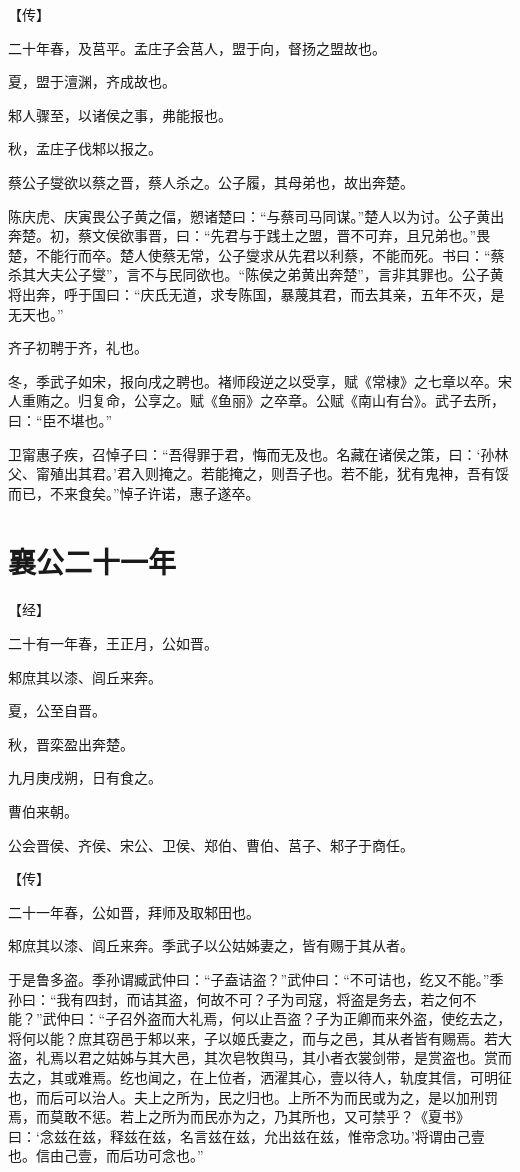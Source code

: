 \documentclass[a4paper,12pt,UTF8,twoside]{ctexbook}
\begin{document}
【传】

二十年春，及莒平。孟庄子会莒人，盟于向，督扬之盟故也。

夏，盟于澶渊，齐成故也。

邾人骤至，以诸侯之事，弗能报也。

秋，孟庄子伐邾以报之。

蔡公子燮欲以蔡之晋，蔡人杀之。公子履，其母弟也，故出奔楚。

陈庆虎、庆寅畏公子黄之偪，愬诸楚曰：“与蔡司马同谋。”楚人以为讨。公子黄出奔楚。初，蔡文侯欲事晋，曰：“先君与于践土之盟，晋不可弃，且兄弟也。”畏楚，不能行而卒。楚人使蔡无常，公子燮求从先君以利蔡，不能而死。书曰：“蔡杀其大夫公子燮”，言不与民同欲也。“陈侯之弟黄出奔楚”，言非其罪也。公子黄将出奔，呼于国曰：“庆氏无道，求专陈国，暴蔑其君，而去其亲，五年不灭，是无天也。”

齐子初聘于齐，礼也。

冬，季武子如宋，报向戌之聘也。褚师段逆之以受享，赋《常棣》之七章以卒。宋人重贿之。归复命，公享之。赋《鱼丽》之卒章。公赋《南山有台》。武子去所，曰：“臣不堪也。”

卫甯惠子疾，召悼子曰：“吾得罪于君，悔而无及也。名藏在诸侯之策，曰：‘孙林父、甯殖出其君。’君入则掩之。若能掩之，则吾子也。若不能，犹有鬼神，吾有馁而已，不来食矣。”悼子许诺，惠子遂卒。


\section{襄公二十一年}


【经】

二十有一年春，王正月，公如晋。

邾庶其以漆、闾丘来奔。

夏，公至自晋。

秋，晋栾盈出奔楚。

九月庚戌朔，日有食之。

曹伯来朝。

公会晋侯、齐侯、宋公、卫侯、郑伯、曹伯、莒子、邾子于商任。

【传】

二十一年春，公如晋，拜师及取邾田也。

邾庶其以漆、闾丘来奔。季武子以公姑姊妻之，皆有赐于其从者。

于是鲁多盗。季孙谓臧武仲曰：“子盍诘盗？”武仲曰：“不可诘也，纥又不能。”季孙曰：“我有四封，而诘其盗，何故不可？子为司寇，将盗是务去，若之何不能？”武仲曰：“子召外盗而大礼焉，何以止吾盗？子为正卿而来外盗，使纥去之，将何以能？庶其窃邑于邾以来，子以姬氏妻之，而与之邑，其从者皆有赐焉。若大盗，礼焉以君之姑姊与其大邑，其次皂牧舆马，其小者衣裳剑带，是赏盗也。赏而去之，其或难焉。纥也闻之，在上位者，洒濯其心，壹以待人，轨度其信，可明征也，而后可以治人。夫上之所为，民之归也。上所不为而民或为之，是以加刑罚焉，而莫敢不惩。若上之所为而民亦为之，乃其所也，又可禁乎？《夏书》曰：‘念兹在兹，释兹在兹，名言兹在兹，允出兹在兹，惟帝念功。’将谓由己壹也。信由己壹，而后功可念也。”
\end{document}
